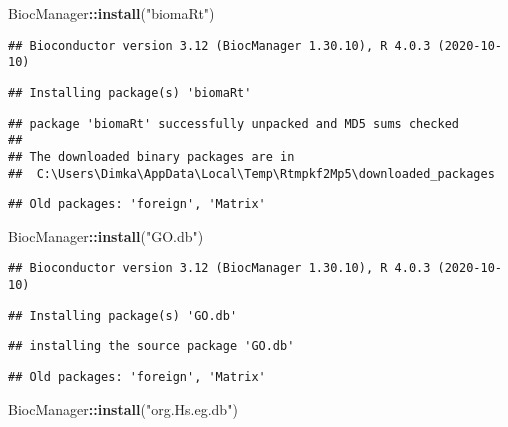 \documentclass[
]{article}
\newenvironment{Shaded}{\begin{snugshade}}{\end{snugshade}}
\newcommand{\KeywordTok}[1]{\textcolor[rgb]{0.13,0.29,0.53}{\textbf{#1}}}
\newcommand{\NormalTok}[1]{#1}
\newcommand{\OperatorTok}[1]{\textcolor[rgb]{0.81,0.36,0.00}{\textbf{#1}}}
\newcommand{\StringTok}[1]{\textcolor[rgb]{0.31,0.60,0.02}{#1}}
\begin{document}
\begin{Shaded}
\begin{Highlighting}[]
\NormalTok{BiocManager}\OperatorTok{::}\KeywordTok{install}\NormalTok{(}\StringTok{"biomaRt"}\NormalTok{)}
\end{Highlighting}
\end{Shaded}

\begin{verbatim}
## Bioconductor version 3.12 (BiocManager 1.30.10), R 4.0.3 (2020-10-10)
\end{verbatim}

\begin{verbatim}
## Installing package(s) 'biomaRt'
\end{verbatim}

\begin{verbatim}
## package 'biomaRt' successfully unpacked and MD5 sums checked
## 
## The downloaded binary packages are in
##  C:\Users\Dimka\AppData\Local\Temp\Rtmpkf2Mp5\downloaded_packages
\end{verbatim}

\begin{verbatim}
## Old packages: 'foreign', 'Matrix'
\end{verbatim}

\begin{Shaded}
\begin{Highlighting}[]
\NormalTok{BiocManager}\OperatorTok{::}\KeywordTok{install}\NormalTok{(}\StringTok{"GO.db"}\NormalTok{)}
\end{Highlighting}
\end{Shaded}

\begin{verbatim}
## Bioconductor version 3.12 (BiocManager 1.30.10), R 4.0.3 (2020-10-10)
\end{verbatim}

\begin{verbatim}
## Installing package(s) 'GO.db'
\end{verbatim}

\begin{verbatim}
## installing the source package 'GO.db'
\end{verbatim}

\begin{verbatim}
## Old packages: 'foreign', 'Matrix'
\end{verbatim}

\begin{Shaded}
\begin{Highlighting}[]
\NormalTok{BiocManager}\OperatorTok{::}\KeywordTok{install}\NormalTok{(}\StringTok{"org.Hs.eg.db"}\NormalTok{)}
\end{Highlighting}
\end{Shaded}
\end{document}
